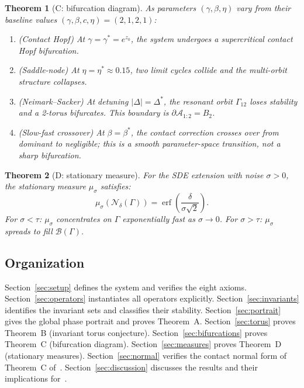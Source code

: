 \documentclass[reqno]{amsart}
\numberwithin{equation}{section}
\theoremstyle{plain}
\newtheorem{theorem}{Theorem}[section]
\theoremstyle{definition}
\theoremstyle{remark}
\newcommand{\Orb}{\Gamma}
\newcommand{\cN}{\mathcal{N}}
\newcommand{\cB}{\mathcal{B}}
\newcommand{\abs}[1]{\left|#1\right|}
\DeclareMathOperator{\erf}{erf}
\begin{document}
\begin{theorem}[C: bifurcation diagram]\label{thm:C}
As parameters $(\gamma,\beta,\eta)$ vary from their baseline values
$(\gamma,\beta,c,\eta)=(2,1,2,1)$:
\begin{enumerate}[label=\textup{(\roman*)}]
  \item \textup{(Contact Hopf)} At $\gamma=\gamma^*=e^{z_0}$, the
        system undergoes a supercritical contact Hopf bifurcation.
  \item \textup{(Saddle-node)} At $\eta=\eta^*\approx 0.15$, two
        limit cycles collide and the multi-orbit structure collapses.
  \item \textup{(Neimark--Sacker)} At detuning $\abs{\Delta}=\Delta^*$,
        the resonant orbit $\Orb_{12}$ loses stability and a 2-torus
        bifurcates. This boundary is $\partial\mathcal{A}_{1:2}=B_2$.
  \item \textup{(Slow-fast crossover)} At $\beta=\beta^*$, the
        contact correction crosses over from dominant to negligible;
        this is a smooth parameter-space transition, not a sharp
        bifurcation.
\end{enumerate}
\end{theorem}

\begin{theorem}[D: stationary measure]\label{thm:D}
For the SDE extension with noise $\sigma>0$, the stationary measure
$\mu_\sigma$ satisfies:
\[
  \mu_\sigma(\cN_\delta(\Orb)) = \erf\!\left(\frac{\delta}{\sigma\sqrt{2}}\right).
\]
For $\sigma<\tau$: $\mu_\sigma$ concentrates on $\Orb$ exponentially
fast as $\sigma\to 0$. For $\sigma>\tau$: $\mu_\sigma$ spreads to
fill $\cB(\Orb)$.
\end{theorem}

\subsection{Organization}

Section~\ref{sec:setup} defines the system and verifies the eight
axioms.
Section~\ref{sec:operators} instantiates all operators explicitly.
Section~\ref{sec:invariants} identifies the invariant sets and
classifies their stability.
Section~\ref{sec:portrait} gives the global phase portrait and
proves Theorem~A.
Section~\ref{sec:torus} proves Theorem~B (invariant torus conjecture).
Section~\ref{sec:bifurcations} proves Theorem~C (bifurcation diagram).
Section~\ref{sec:measures} proves Theorem~D (stationary measures).
Section~\ref{sec:normal} verifies the contact normal form of
Theorem~C of~\cite{Paper1}.
Section~\ref{sec:discussion} discusses the results and their
implications for~\cite{Paper1}.
\end{document}
